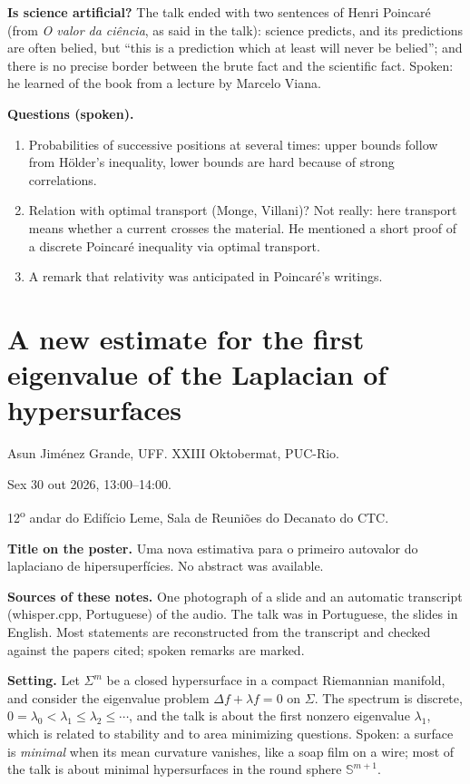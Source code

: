 \medskip\noindent
{\bf Is science artificial?} The talk ended
with two sentences of Henri Poincar\'e (from
\emph{O valor da ci\^encia}, as said in the
talk): science predicts, and its predictions
are often belied, but ``this is a prediction
which at least will never be belied''; and
there is no precise border between the brute
fact and the scientific fact. Spoken: he
learned of the book from a lecture by
Marcelo Viana.

\medskip\noindent
{\bf Questions (spoken).}
\begin{enumerate}
\item Probabilities of successive positions
at several times: upper bounds follow from
H\"older's inequality, lower bounds are hard
because of strong correlations.
\item Relation with optimal transport (Monge,
Villani)? Not really: here transport means
whether a current crosses the material. He
mentioned a short proof of a discrete
Poincar\'e inequality via optimal transport.
\item A remark that relativity was
anticipated in Poincar\'e's writings.
\end{enumerate}

\section{A new estimate for the first eigenvalue of the Laplacian of hypersurfaces}
\label{section-jimenez-first-eigenvalue}

\noindent
Asun Jim\'enez Grande, UFF.
XXIII Oktobermat, PUC-Rio.

Sex 30 out 2026, 13:00--14:00.

12\textsuperscript{o} andar do Edif\'icio
Leme, Sala de Reuni\~oes do Decanato do CTC.

\medskip\noindent
{\bf Title on the poster.} Uma nova
estimativa para o primeiro autovalor do
laplaciano de hipersuperf\'icies. No
abstract was available.

\medskip\noindent
{\bf Sources of these notes.} One photograph
of a slide and an automatic transcript
(whisper.cpp, Portuguese) of the audio. The
talk was in Portuguese, the slides in
English. Most statements are reconstructed
from the transcript and checked against the
papers cited; spoken remarks are marked.

\medskip\noindent
{\bf Setting.} Let $\Sigma^m$ be a closed
hypersurface in a compact Riemannian
manifold, and consider the eigenvalue
problem $\Delta f + \lambda f = 0$ on
$\Sigma$. The spectrum is discrete,
$0 = \lambda_0 < \lambda_1 \le \lambda_2
\le \cdots$, and the talk is about the
first nonzero eigenvalue $\lambda_1$, which
is related to stability and to area
minimizing questions. Spoken: a surface is
\emph{minimal} when its mean curvature
vanishes, like a soap film on a wire; most
of the talk is about minimal hypersurfaces
in the round sphere $\mathbb{S}^{m+1}$.

